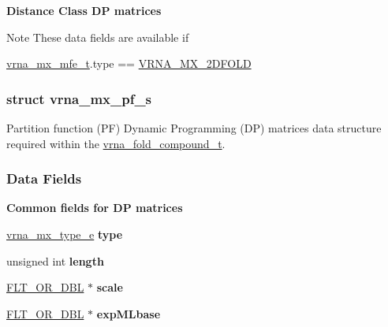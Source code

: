 \begin{Indent}\textbf{ Distance Class DP matrices}\par
{\em \begin{DoxyNote}{Note}
These data fields are available if 
\begin{DoxyCode}
\hyperlink{group__dp__matrices_structvrna__mx__mfe__s}{vrna\_mx\_mfe\_t}.type == \hyperlink{group__dp__matrices_gga6042ea1d58d01931e959791be6d89343ae656f8391445ff71bed8a597a0a19417}{VRNA\_MX\_2DFOLD} 
\end{DoxyCode}
 
\end{DoxyNote}
}\end{Indent}
\label{structvrna__mx__pf__s}
\subsubsection{struct vrna\+\_\+mx\+\_\+pf\+\_\+s}
Partition function (PF) Dynamic Programming (DP) matrices data structure required within the \hyperlink{group__fold__compound_ga1b0cef17fd40466cef5968eaeeff6166}{vrna\+\_\+fold\+\_\+compound\+\_\+t}. \subsubsection*{Data Fields}
\begin{Indent}\textbf{ Common fields for DP matrices}\par
\begin{DoxyCompactItemize}
\item 
\mbox{\label{group__dp__matrices_a74ba745d6fc4ac5d437bc24450ea789c}} 
\hyperlink{group__dp__matrices_ga6042ea1d58d01931e959791be6d89343}{vrna\+\_\+mx\+\_\+type\+\_\+e} {\bfseries type}
\item 
\mbox{\label{group__dp__matrices_a798f72ece3f3f970bb0de2120600ad63}} 
unsigned int {\bfseries length}
\item 
\mbox{\label{group__dp__matrices_a133ac57938cb0969da254a594572baf8}} 
\hyperlink{group__data__structures_ga31125aeace516926bf7f251f759b6126}{F\+L\+T\+\_\+\+O\+R\+\_\+\+D\+BL} $\ast$ {\bfseries scale}
\item 
\mbox{\label{group__dp__matrices_ae18e83833416f62943d5dd7be1cc038f}} 
\hyperlink{group__data__structures_ga31125aeace516926bf7f251f759b6126}{F\+L\+T\+\_\+\+O\+R\+\_\+\+D\+BL} $\ast$ {\bfseries exp\+M\+Lbase}
\end{DoxyCompactItemize}
\end{Indent}
